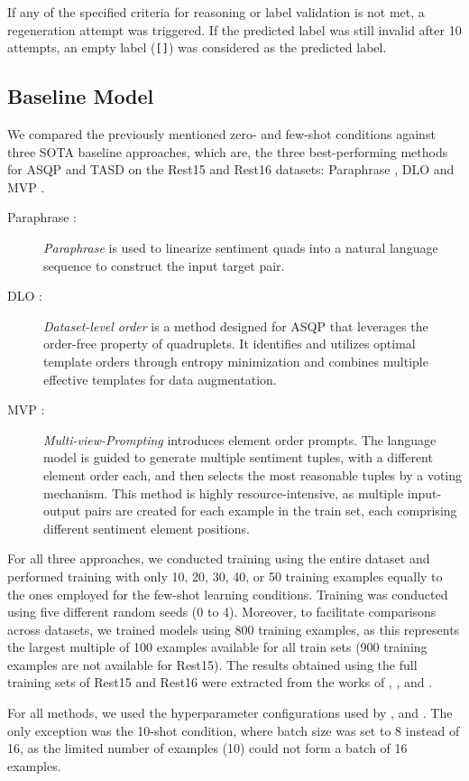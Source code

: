 If any of the specified criteria for reasoning or label validation is not met, a regeneration attempt was triggered. If the predicted label was still invalid after 10 attempts, an empty label (\texttt{[]}) was considered as the predicted label.

\subsection{Baseline Model}

We compared the previously mentioned zero- and few-shot conditions against three SOTA baseline approaches, which are, the three best-performing methods for ASQP and TASD on the Rest15 and Rest16 datasets: Paraphrase \citep{zhang2021aspect}, DLO \citep{hu2022improving} and MVP \citep{gou2023mvp}.

\begin{description}
    \item[Paraphrase \citep{zhang2021aspect}:] \textit{Paraphrase} is used to linearize sentiment quads into a natural language sequence to construct the input target pair.
    \item[DLO \citep{hu2022improving}:] \textit{Dataset-level order} is a method designed for ASQP that leverages the order-free property of quadruplets. It identifies and utilizes optimal template orders through entropy minimization and combines multiple effective templates for data augmentation.
    \item[MVP \citep{gou2023mvp}:] \textit{Multi-view-Prompting} introduces element order prompts. The language model is guided to generate multiple sentiment tuples, with a different element order each, and then selects the most reasonable tuples by a voting mechanism. This method is highly resource-intensive, as multiple input-output pairs are created for each example in the train set, each comprising different sentiment element positions.
\end{description}

For all three approaches, we conducted training using the entire dataset and performed training with only 10, 20, 30, 40, or 50 training examples equally to the ones employed for the few-shot learning conditions. Training was conducted using five different random seeds (0 to 4). Moreover, to facilitate comparisons across datasets, we trained models using 800 training examples, as this represents the largest multiple of 100 examples available for all train sets (900 training examples are not available for Rest15). The results obtained using the full training sets of Rest15 and Rest16 were extracted from the works of \citet{zhang2021aspect}, \citet{hu2022improving}, and \citet{gou2023mvp}.

For all methods, we used the hyperparameter configurations used by \citet{zhang2021aspect}, \citet{hu2022improving} and \citet{gou2023mvp}. The only exception was the 10-shot condition, where batch size was set to 8 instead of 16, as the limited number of examples (10) could not form a batch of 16 examples.
